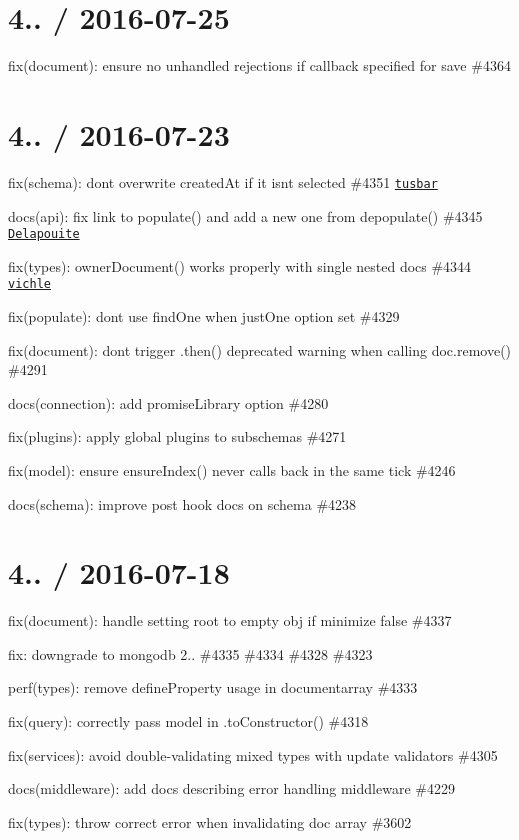 \section*{4.. / 2016-\/07-\/25 }


\begin{DoxyItemize}
\item fix(document)\+: ensure no unhandled rejections if callback specified for save \#4364
\end{DoxyItemize}

\section*{4.. / 2016-\/07-\/23 }


\begin{DoxyItemize}
\item fix(schema)\+: don\textquotesingle{}t overwrite created\+At if it isn\textquotesingle{}t selected \#4351 \href{https://github.com/tusbar}{\tt tusbar}
\item docs(api)\+: fix link to populate() and add a new one from depopulate() \#4345 \href{https://github.com/Delapouite}{\tt Delapouite}
\item fix(types)\+: owner\+Document() works properly with single nested docs \#4344 \href{https://github.com/vichle}{\tt vichle}
\item fix(populate)\+: dont use find\+One when just\+One option set \#4329
\item fix(document)\+: dont trigger .then() deprecated warning when calling doc.\+remove() \#4291
\item docs(connection)\+: add promise\+Library option \#4280
\item fix(plugins)\+: apply global plugins to subschemas \#4271
\item fix(model)\+: ensure {\ttfamily ensure\+Index()} never calls back in the same tick \#4246
\item docs(schema)\+: improve post hook docs on schema \#4238
\end{DoxyItemize}

\section*{4.. / 2016-\/07-\/18 }


\begin{DoxyItemize}
\item fix(document)\+: handle setting root to empty obj if minimize false \#4337
\item fix\+: downgrade to mongodb 2.. \#4335 \#4334 \#4328 \#4323
\item perf(types)\+: remove define\+Property usage in documentarray \#4333
\item fix(query)\+: correctly pass model in .to\+Constructor() \#4318
\item fix(services)\+: avoid double-\/validating mixed types with update validators \#4305
\item docs(middleware)\+: add docs describing error handling middleware \#4229
\item fix(types)\+: throw correct error when invalidating doc array \#3602
\end{DoxyItemize}

